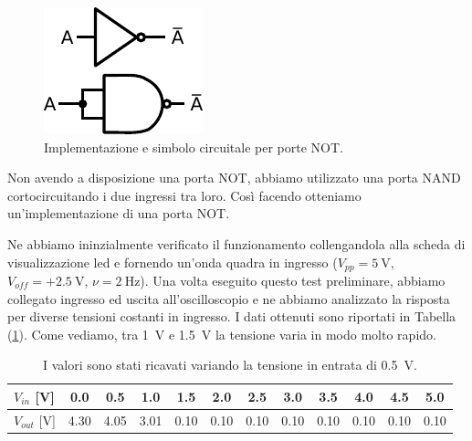 \begin{figure}
\centering
\includegraphics[width=.16\textwidth]{../E09/latex/NOT.pdf}
\caption{Implementazione e simbolo circuitale per porte NOT.}
\label{cir9:not}
\end{figure}

Non avendo a disposizione una porta NOT, abbiamo utilizzato una porta NAND cortocircuitando i due ingressi tra loro.
Così facendo otteniamo un'implementazione di una porta NOT.

Ne abbiamo ininzialmente verificato il funzionamento collengandola alla scheda di visualizzazione led e fornendo un'onda quadra in ingresso ($V_{pp}=\SI{5}{\volt}$, $V_{off}=+\SI{2.5}{\volt}$, $\nu=\SI{2}{\hertz}$).
Una volta eseguito questo test preliminare, abbiamo collegato ingresso ed uscita all'oscilloscopio e ne abbiamo analizzato la risposta per diverse tensioni costanti in ingresso.
I dati ottenuti sono riportati in Tabella (\ref{tab9:risposta2}).
Come vediamo, tra \SI{1}{\volt} e \SI{1.5}{\volt} la tensione varia in modo molto rapido.

\vspace{2mm}
\begin{table}[htpc]
\centering
{\renewcommand{\arraystretch}{1.1}%
\begin{tabular}{l|c|c|c|c|c|c|c|c|c|c|c}
$V_{in}$ [\si{\volt}] & 0.0 & 0.5 & 1.0 & 1.5 & 2.0 & 2.5 & 3.0 & 3.5 & 4.0 & 4.5 & 5.0 \\
\hline
$V_{out}$ [\si{\volt}] & 4.30 & 4.05 & 3.01 & 0.10 & 0.10 & 0.10 & 0.10 & 0.10 & 0.10 & 0.10 & 0.10 \\
\end{tabular}}
\caption{I valori sono stati ricavati variando la tensione in entrata di \SI{.5}{\V}.}
\label{tab9:risposta2}
\end{table}

